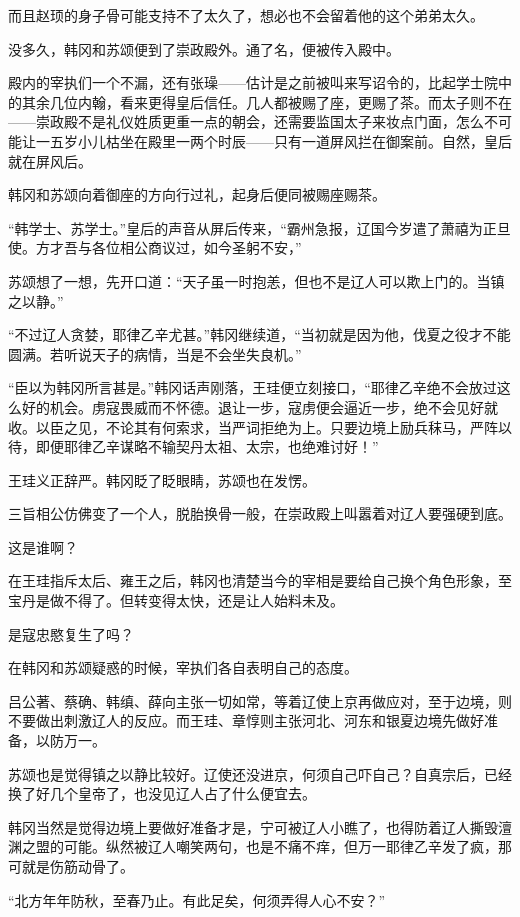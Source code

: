 而且赵顼的身子骨可能支持不了太久了，想必也不会留着他的这个弟弟太久。

没多久，韩冈和苏颂便到了崇政殿外。通了名，便被传入殿中。

殿内的宰执们一个不漏，还有张璪——估计是之前被叫来写诏令的，比起学士院中的其余几位内翰，看来更得皇后信任。几人都被赐了座，更赐了茶。而太子则不在——崇政殿不是礼仪姓质更重一点的朝会，还需要监国太子来妆点门面，怎么不可能让一五岁小儿枯坐在殿里一两个时辰——只有一道屏风拦在御案前。自然，皇后就在屏风后。

韩冈和苏颂向着御座的方向行过礼，起身后便同被赐座赐茶。

“韩学士、苏学士。”皇后的声音从屏后传来，“霸州急报，辽国今岁遣了萧禧为正旦使。方才吾与各位相公商议过，如今圣躬不安，”

苏颂想了一想，先开口道：“天子虽一时抱恙，但也不是辽人可以欺上门的。当镇之以静。”

“不过辽人贪婪，耶律乙辛尤甚。”韩冈继续道，“当初就是因为他，伐夏之役才不能圆满。若听说天子的病情，当是不会坐失良机。”

“臣以为韩冈所言甚是。”韩冈话声刚落，王珪便立刻接口，“耶律乙辛绝不会放过这么好的机会。虏寇畏威而不怀德。退让一步，寇虏便会逼近一步，绝不会见好就收。以臣之见，不论其有何索求，当严词拒绝为上。只要边境上励兵秣马，严阵以待，即便耶律乙辛谋略不输契丹太祖、太宗，也绝难讨好！”

王珪义正辞严。韩冈眨了眨眼睛，苏颂也在发愣。

三旨相公仿佛变了一个人，脱胎换骨一般，在崇政殿上叫嚣着对辽人要强硬到底。

这是谁啊？

在王珪指斥太后、雍王之后，韩冈也清楚当今的宰相是要给自己换个角色形象，至宝丹是做不得了。但转变得太快，还是让人始料未及。

是寇忠愍复生了吗？

在韩冈和苏颂疑惑的时候，宰执们各自表明自己的态度。

吕公著、蔡确、韩缜、薛向主张一切如常，等着辽使上京再做应对，至于边境，则不要做出刺激辽人的反应。而王珪、章惇则主张河北、河东和银夏边境先做好准备，以防万一。

苏颂也是觉得镇之以静比较好。辽使还没进京，何须自己吓自己？自真宗后，已经换了好几个皇帝了，也没见辽人占了什么便宜去。

韩冈当然是觉得边境上要做好准备才是，宁可被辽人小瞧了，也得防着辽人撕毁澶渊之盟的可能。纵然被辽人嘲笑两句，也是不痛不痒，但万一耶律乙辛发了疯，那可就是伤筋动骨了。

“北方年年防秋，至春乃止。有此足矣，何须弄得人心不安？”

